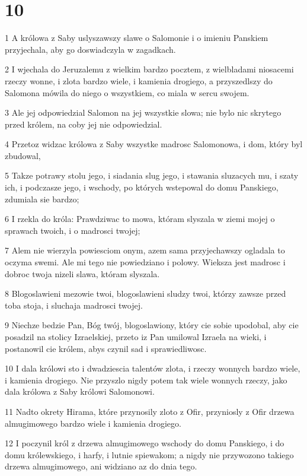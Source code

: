 \chapter{10}

\par 1 A królowa z Saby uslyszawszy slawe o Salomonie i o imieniu Panskiem przyjechala, aby go doswiadczyla w zagadkach.
\par 2 I wjechala do Jeruzalemu z wielkim bardzo pocztem, z wielbladami niosacemi rzeczy wonne, i zlota bardzo wiele, i kamienia drogiego, a przyszedlszy do Salomona mówila do niego o wszystkiem, co miala w sercu swojem.
\par 3 Ale jej odpowiedzial Salomon na jej wszystkie slowa; nie bylo nic skrytego przed królem, na coby jej nie odpowiedzial.
\par 4 Przetoz widzac królowa z Saby wszystke madrosc Salomonowa, i dom, który byl zbudowal,
\par 5 Takze potrawy stolu jego, i siadania slug jego, i stawania sluzacych mu, i szaty ich, i podczasze jego, i wschody, po których wstepowal do domu Panskiego, zdumiala sie bardzo;
\par 6 I rzekla do króla: Prawdziwac to mowa, któram slyszala w ziemi mojej o sprawach twoich, i o madrosci twojej;
\par 7 Alem nie wierzyla powiesciom onym, azem sama przyjechawszy ogladala to oczyma swemi. Ale mi tego nie powiedziano i polowy. Wieksza jest madrosc i dobroc twoja nizeli slawa, któram slyszala.
\par 8 Blogoslawieni mezowie twoi, blogoslawieni sludzy twoi, którzy zawsze przed toba stoja, i sluchaja madrosci twojej.
\par 9 Niechze bedzie Pan, Bóg twój, blogoslawiony, który cie sobie upodobal, aby cie posadzil na stolicy Izraelskiej, przeto iz Pan umilowal Izraela na wieki, i postanowil cie królem, abys czynil sad i sprawiedliwosc.
\par 10 I dala królowi sto i dwadziescia talentów zlota, i rzeczy wonnych bardzo wiele, i kamienia drogiego. Nie przyszlo nigdy potem tak wiele wonnych rzeczy, jako dala królowa z Saby królowi Salomonowi.
\par 11 Nadto okrety Hirama, które przynosily zloto z Ofir, przyniosly z Ofir drzewa almugimowego bardzo wiele i kamienia drogiego.
\par 12 I poczynil król z drzewa almugimowego wschody do domu Panskiego, i do domu królewskiego, i harfy, i lutnie spiewakom; a nigdy nie przywozono takiego drzewa almugimowego, ani widziano az do dnia tego.
